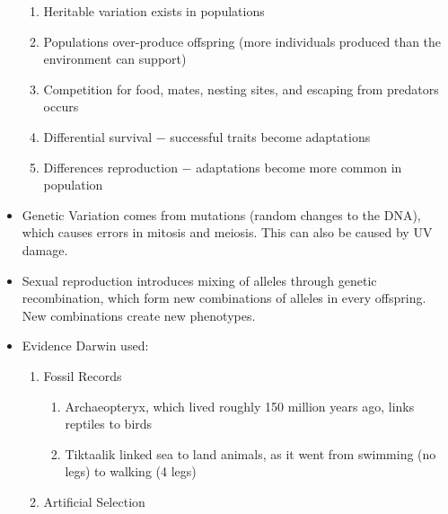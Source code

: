 \documentclass[12pt]{article}
\begin{document}
\begin{itemize}
    \begin{enumerate}

      \item Heritable variation exists in populations

      \item Populations over-produce offspring (more individuals produced than the environment can support)

      \item Competition for food, mates, nesting sites, and escaping from predators occurs

      \item Differential survival $-$ successful traits become adaptations

      \item Differences reproduction $-$ adaptations become more common in population

    \end{enumerate}

  \item Genetic Variation comes from mutations (random changes to the DNA), which causes errors in mitosis and meiosis. This can also be caused by UV damage.

  \item Sexual reproduction introduces mixing of alleles through genetic recombination, which form new combinations of alleles in every offspring. New combinations create new phenotypes.

  \item Evidence Darwin used:

    \begin{enumerate}

      \item Fossil Records

        \begin{enumerate}

          \item Archaeopteryx, which lived roughly 150 million years ago, links reptiles to birds

          \item Tiktaalik linked sea to land animals, as it went from swimming (no legs) to walking (4 legs)

        \end{enumerate}

      \item Artificial Selection

        \begin{enumerate}


\end{enumerate}
\end{enumerate}
\end{itemize}
\end{document}
